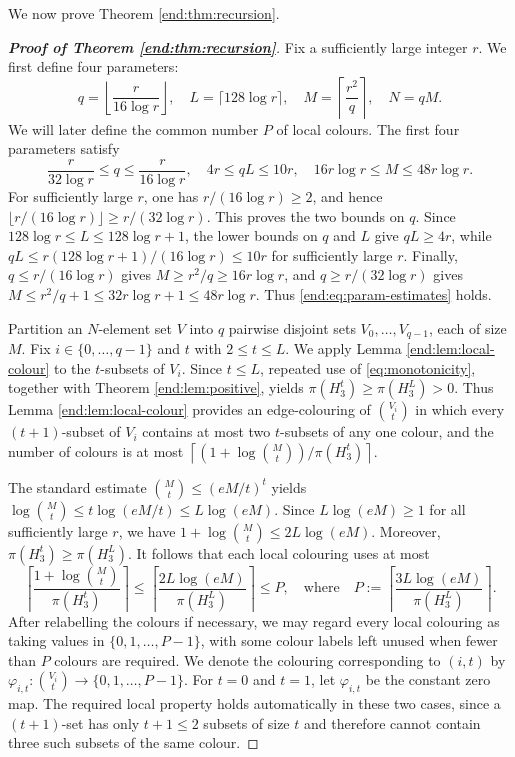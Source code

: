 \documentclass[12pt,a4paper]{article}
\numberwithin{equation}{section}
\theoremstyle{definition}
\theoremstyle{remark}
\begin{document}
\medskip
We now prove Theorem \ref{end:thm:recursion}.


\begin{proof}[\bfseries{Proof of Theorem \ref{end:thm:recursion}}]
Fix a sufficiently large integer $r$.  We first define four parameters:
$$ q=\left\lfloor\frac{r}{16\log r}\right\rfloor,
 \quad L=\lceil128\log r\rceil,
 \quad M=\left\lceil\frac{r^2}{q}\right\rceil,
 \quad N=qM.$$
We will later define the common number $P$ of local colours.  The first four parameters satisfy
\begin{equation}\label{end:eq:param-estimates}
 \frac{r}{32\log r}\le q\le\frac{r}{16\log r},
 \quad 4r\le qL\le10r,
 \quad 16r\log r\le M\le48r\log r.
\end{equation}
For sufficiently large $r$, one has $r/(16\log r)\ge2$, and hence $\lfloor r/(16\log r)\rfloor\ge r/(32\log r)$.  This proves the two bounds on $q$.  Since $128\log r\le L\le128\log r+1$, the lower bounds on $q$ and $L$ give $qL\ge4r$, while
$qL\le r(128\log r+1)/(16\log r)\le10r$ for sufficiently large $r$.  Finally, $q\le r/(16\log r)$ gives $M\ge r^2/q\ge16r\log r$, and $q\ge r/(32\log r)$ gives
$M\le r^2/q+1\le32r\log r+1\le48r\log r$.  
Thus \eqref{end:eq:param-estimates} holds.


Partition an $N$-element set $V$ into $q$ pairwise disjoint sets $V_0,\ldots,V_{q-1}$, each of size $M$.  Fix $i\in\{0,\ldots,q-1\}$ and $t$ with $2\le t\le L$.  
We apply Lemma \ref{end:lem:local-colour} to the $t$-subsets of $V_i$.  
Since $t\le L$, repeated use of \eqref{eq:monotonicity}, together with Theorem  \ref{end:lem:positive}, yields $\pi(H_3^t)\ge\pi(H_3^L)>0$.  
Thus Lemma \ref{end:lem:local-colour} provides an edge-colouring of $\binom{V_i}t$ in which every $(t+1)$-subset of $V_i$ contains at most two $t$-subsets of any one colour, and the number of colours is at most $\left\lceil(1+\log\binom Mt)/\pi(H_3^t)\right\rceil$.

The standard estimate $\binom Mt\le(eM/t)^t$ yields $\log\binom Mt\le t\log(eM/t)\le L\log(eM)$.  Since $L\log(eM)\ge1$ for all sufficiently large $r$, we have $1+\log\binom Mt\le2L\log(eM)$.  Moreover, $\pi(H_3^t)\ge\pi(H_3^L)$.  It follows that each local colouring uses at most
$$ \left\lceil\frac{1+\log\binom Mt}{\pi(H_3^t)}\right\rceil
 \le \left\lceil\frac{2L\log(eM)}{\pi(H_3^L)}\right\rceil
 \le P,
 \quad \text{where} \quad
 P:=\left\lceil\frac{3L\log(eM)}{\pi(H_3^L)}\right\rceil.$$
After relabelling the colours if necessary, we may regard every local colouring as taking values in $\{0,1,\ldots,P-1\}$, with some colour labels left unused when fewer than $P$ colours are required.  We denote the colouring corresponding to $(i,t)$ by
$\varphi_{i,t}:\binom{V_i}t\to\{0,1,\ldots,P-1\}$.
For $t=0$ and $t=1$, let $\varphi_{i,t}$ be the constant zero map.  The required local property holds automatically in these two cases, since a $(t+1)$-set has only $t+1\le2$ subsets of size $t$ and therefore cannot contain three such subsets of the same colour.



\end{proof}
\end{document}
